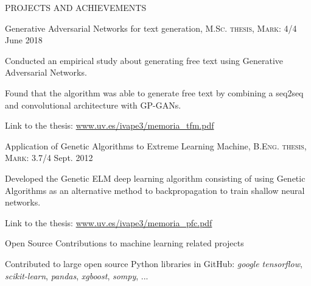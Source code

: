 \documentclass{resume} %
\begin{document}
\begin{rSection}{PROJECTS AND ACHIEVEMENTS}

\begin{rSubsection}{Generative Adversarial Networks for text generation, \textnormal{\textsc{M.Sc. thesis, Mark: 4/4}}}
{June 2018}{}{}  %

\vspace{-3pt}

\item Conducted an empirical study about generating free text using Generative Adversarial Networks.
\item Found that the algorithm was able to generate free text by combining a seq2seq and convolutional architecture with GP-GANs.
\item Link to the thesis: \href{https://www.uv.es/ivape3/memoria_tfm.pdf}{www.uv.es/ivape3/memoria\_tfm.pdf}

\end{rSubsection}

\vspace{-6pt}

\begin{rSubsection}{Application of Genetic Algorithms to Extreme Learning Machine, \textnormal{\textsc{B.Eng. thesis, Mark: 3.7/4}}}
{Sept. 2012}{}{}  

\vspace{-3pt}

\item Developed the Genetic ELM deep learning algorithm consisting of using Genetic Algorithms as an alternative method to backpropagation to train shallow neural networks.
\item Link to the thesis: \href{https://www.uv.es/ivape3/memoria_pfc.pdf}{www.uv.es/ivape3/memoria\_pfc.pdf}

\end{rSubsection}

\vspace{-6pt}

\begin{rSubsection}{Open Source Contributions to machine learning related projects}
{}{}{}  

\vspace{-3pt}

\item Contributed to large open source Python libraries in GitHub: \textit{google tensorflow}, \textit{scikit-learn}, \textit{pandas}, \textit{xgboost}, \textit{sompy}, ... 


\end{rSubsection}
\end{rSection}
\end{document}
